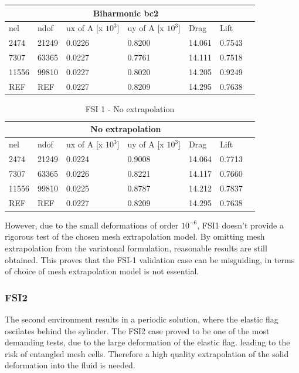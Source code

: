 \begin{table}[h!]
\begin{tabular}{ |p{1cm}||p{1cm}|p{2.5cm}|p{2.5cm}|p{2.7cm}|p{2.7cm}|p{1.2cm}|}
 \hline
\end{tabular}
\begin{tabular}{ |p{1cm}||p{1cm}|p{2.5cm}|p{2.5cm}|p{2.7cm}|p{2.7cm}|p{1.2cm}|}
 \hline
  \multicolumn{6}{|c|}{Biharmonic bc2} \\
   \hline
nel & ndof & ux of A [x $10^{3}$]  &uy of A [x $10^{3}$]& Drag  & Lift \\
 \hline
 2474    & 21249  &       0.0226 &       0.8200 & 14.061 & 0.7543 \\
 7307    & 63365  &       0.0227 &       0.7761 & 14.111 & 0.7518 \\
 11556   & 99810  &       0.0227 &       0.8020 & 14.205 & 0.9249  \\
  \hline 
 REF     & REF    &       0.0227      &       0.8209      & 14.295  & 0.7638   \\
 \hline
\end{tabular}
\end{table}


\begin{table}[h!]
\centering
\caption{FSI 1 - No extrapolation}
\label{FSI1- No extrapolation}
\begin{tabular}{ |p{1cm}||p{1cm}|p{2.5cm}|p{2.5cm}|p{2.7cm}|p{2.7cm}|p{1.2cm}|}
 \hline
  \multicolumn{6}{|c|}{No extrapolation} \\
   \hline
nel & ndof & ux of A [x $10^{3}$]  &uy of A [x $10^{3}$]& Drag  & Lift \\
 \hline
 2474    & 21249  &       0.0224 &       0.9008 & 14.064 & 0.7713 \\
 7307    & 63365  &       0.0226  &       0.8221 & 14.117 & 0.7660 \\
 11556   & 99810  &       0.0225 &       0.8787 & 14.212 & 0.7837 \\
  \hline 
 REF     & REF    &       0.0227      &       0.8209      & 14.295  & 0.7638   \\
 \hline
\end{tabular}

\end{table}


However, due to the small deformations of order $10^{-6}$, FSI1 doesn't provide a rigorous test of the chosen mesh extrapolation model. By omitting mesh extrapolation from the variatonal formulation,  reasonable results are still obtained. This proves that the FSI-1 validation case can be misguiding, in terms of choice of mesh extrapolation model is not essential. 


\newpage \newpage
\subsubsection{FSI2}
The second environment results in a periodic solution, where the elastic flag oscilates behind the sylinder. 
The FSI2 case proved to be one of the most demanding tests, due to the large deformation of the elastic flag. leading to the risk of entangled mesh cells. Therefore a high quality extrapolation of the solid deformation into the fluid is needed.


